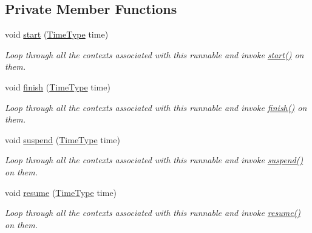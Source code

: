 \subsection*{Private Member Functions}
\begin{DoxyCompactItemize}
\item 
void \hyperlink{structvt_1_1runnable_1_1_runnable_new_aa02ba804a06924c5aac52d3361509298}{start} (\hyperlink{namespacevt_a2b9f28078dc309ad0706b69ded743e69}{Time\+Type} time)
\begin{DoxyCompactList}\small\item\em Loop through all the contexts associated with this runnable and invoke {\ttfamily \hyperlink{structvt_1_1runnable_1_1_runnable_new_aa02ba804a06924c5aac52d3361509298}{start()}} on them. \end{DoxyCompactList}\item 
void \hyperlink{structvt_1_1runnable_1_1_runnable_new_a089297ae1be6e7bf33ae28611b12db17}{finish} (\hyperlink{namespacevt_a2b9f28078dc309ad0706b69ded743e69}{Time\+Type} time)
\begin{DoxyCompactList}\small\item\em Loop through all the contexts associated with this runnable and invoke {\ttfamily \hyperlink{structvt_1_1runnable_1_1_runnable_new_a089297ae1be6e7bf33ae28611b12db17}{finish()}} on them. \end{DoxyCompactList}\item 
void \hyperlink{structvt_1_1runnable_1_1_runnable_new_a3f3a4b5897430e613b827b8da414ee9c}{suspend} (\hyperlink{namespacevt_a2b9f28078dc309ad0706b69ded743e69}{Time\+Type} time)
\begin{DoxyCompactList}\small\item\em Loop through all the contexts associated with this runnable and invoke {\ttfamily \hyperlink{structvt_1_1runnable_1_1_runnable_new_a3f3a4b5897430e613b827b8da414ee9c}{suspend()}} on them. \end{DoxyCompactList}\item 
void \hyperlink{structvt_1_1runnable_1_1_runnable_new_a6ee6d1cfc510876725cfb32e364c5ee9}{resume} (\hyperlink{namespacevt_a2b9f28078dc309ad0706b69ded743e69}{Time\+Type} time)
\begin{DoxyCompactList}\small\item\em Loop through all the contexts associated with this runnable and invoke {\ttfamily \hyperlink{structvt_1_1runnable_1_1_runnable_new_a6ee6d1cfc510876725cfb32e364c5ee9}{resume()}} on them. \end{DoxyCompactList}\end{DoxyCompactItemize}
